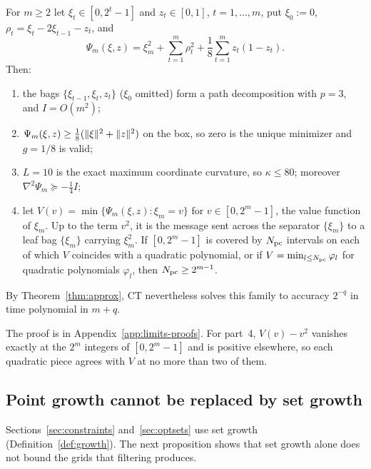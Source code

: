 \begin{proposition}
\label{lim:prop:messages}
For $m\ge2$ let $\xi_t\in[0,2^t-1]$ and $z_t\in[0,1]$, $t=1,\ldots,m$, put
$\xi_0:=0$, $\rho_t=\xi_t-2\xi_{t-1}-z_t$, and
\[
\Psi_m(\xi,z)=\xi_m^2+\sum_{t=1}^m\rho_t^2+\frac18\sum_{t=1}^mz_t(1-z_t).
\]
Then:
\begin{enumerate}
\item the bags $\{\xi_{t-1},\xi_t,z_t\}$ ($\xi_0$ omitted) form a path
  decomposition with $p=3$, and $I=O(m^2)$;
\item $\Psi_m(\xi,z)\ge\frac18(\lVert \xi\rVert^2+\lVert z\rVert^2)$ on the box, so zero is
  the unique minimizer and $g=1/8$ is valid;
\item $L=10$ is the exact maximum coordinate curvature, so $\kappa\le80$;
  moreover $\nabla^2\Psi_m\succeq-\frac14I$;
\item let $V(v)=\min\{\Psi_m(\xi,z):\xi_m=v\}$ for $v\in[0,2^m-1]$, the
  value function of $\xi_m$. Up to the term $v^2$, it is the message sent
  across the separator $\{\xi_m\}$ to a leaf bag $\{\xi_m\}$ carrying
  $\xi_m^2$. If $[0,2^m-1]$ is covered by $N_{\rm pc}$ intervals on each of
  which $V$ coincides with a quadratic polynomial, or if
  $V=\min_{l\le N_{\rm pc}}\varphi_l$ for quadratic polynomials $\varphi_l$,
  then $N_{\rm pc}\ge2^{m-1}$.
\end{enumerate}
By Theorem~\ref{thm:approx}, CT nevertheless solves this family to accuracy
$2^{-q}$ in time polynomial in $m+q$.
\end{proposition}

The proof is in Appendix~\ref{app:limits-proofs}. For part~4, $V(v)-v^2$
vanishes exactly at the $2^m$ integers of $[0,2^m-1]$ and is positive
elsewhere, so each quadratic piece agrees with $V$ at no more than two of
them.

\subsection{Point growth cannot be replaced by set growth}
\label{sec:limits-setgrowth}

Sections~\ref{sec:constraints} and~\ref{sec:optsets} use set growth
(Definition~\ref{def:growth}). The next proposition shows that set growth
alone does not bound the grids that filtering produces.

